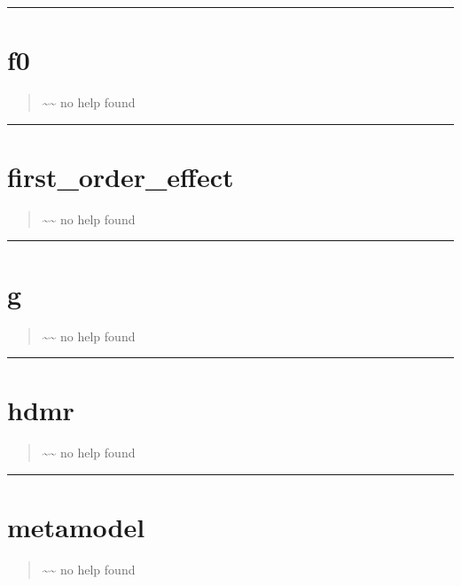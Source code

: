 \documentclass[letterpaper,10pt,english]{sphinxmanual}
\begin{document}
\bigskip\hrule{}\bigskip



\section{f0}
\label{classes/utils/@hdmr/hdmr:f0}\label{classes/utils/@hdmr/hdmr:id9}\begin{quote}

\textasciitilde{}\textasciitilde{} no help found
\end{quote}


\bigskip\hrule{}\bigskip



\section{first\_order\_effect}
\label{classes/utils/@hdmr/hdmr:id10}\label{classes/utils/@hdmr/hdmr:first-order-effect}\begin{quote}

\textasciitilde{}\textasciitilde{} no help found
\end{quote}


\bigskip\hrule{}\bigskip



\section{g}
\label{classes/utils/@hdmr/hdmr:id11}\label{classes/utils/@hdmr/hdmr:g}\begin{quote}

\textasciitilde{}\textasciitilde{} no help found
\end{quote}


\bigskip\hrule{}\bigskip



\section{hdmr}
\label{classes/utils/@hdmr/hdmr:id12}\label{classes/utils/@hdmr/hdmr:hdmr}\begin{quote}

\textasciitilde{}\textasciitilde{} no help found
\end{quote}


\bigskip\hrule{}\bigskip



\section{metamodel}
\label{classes/utils/@hdmr/hdmr:id13}\label{classes/utils/@hdmr/hdmr:metamodel}\begin{quote}

\textasciitilde{}\textasciitilde{} no help found
\end{quote}
\end{document}

